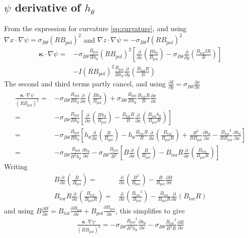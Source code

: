 \documentclass[12pt]{article}
\newcommand{\sbt}{\ensuremath{\sigma_{B\theta}}}
\newcommand{\deriv}[2]{\ensuremath{\frac{\partial #1}{\partial #2}}}
\newcommand{\hthe}{\ensuremath{h_\theta}}
\newcommand{\Bp}{\ensuremath{B_{\text{pol}}}}
\newcommand{\Bt}{\ensuremath{B_{\text{tor}}}}
\newcommand{\ve}[1]{\ensuremath{\boldsymbol{#1}}}
\newcommand{\kvec}{\ve{\kappa}}
\newcommand{\rbp}{\ensuremath{R\Bp}}
\newcommand{\rbpsq}{\ensuremath{\left(\rbp\right)^2}}
\begin{document}
\subsection{\texorpdfstring{$\psi$}{psi}
%
 derivative of \texorpdfstring{$\hthe$}{h}} From the expression for curvature
 \ref{eq:curvature}, and using $\nabla x \cdot \nabla \psi = \sbt
 \left(R\Bp\right)^2$ and $\nabla z\cdot\nabla \psi = -\sbt I
 \left(R\Bp\right)^2$
%
\begin{align*}
\kvec\cdot\nabla\psi =& -\sbt
    \frac{\Bp}{B\hthe}\rbpsq\left[\deriv{}{x}\left(\frac{B\hthe}{\Bp}\right) -
    \sbt\deriv{}{y}\left(\frac{\Bt IR}{B}\right)\right] \\ &- I\rbpsq
        \frac{\Bp}{B\hthe}\deriv{}{y}\left(\frac{\Bt R}{B}\right)
\end{align*}
%
The second and third terms partly cancel, and using $\deriv{I}{y} = \sbt
\deriv{\nu}{x}$
%
\begin{align*}
  \frac{\kvec\cdot\nabla\psi}{\rbpsq} =&
    -\sbt\frac{\Bp}{B\hthe}\deriv{}{x}\left(\frac{B\hthe}{\Bp}\right) +
    \sbt\frac{\Bp}{B\hthe}\frac{\Bt R}{B}\deriv{\nu}{x} \\ =&
    -\sbt\frac{\Bp}{B\hthe}\left[\deriv{}{x}\left(\frac{B\hthe}{\Bp}\right) -
    \frac{\Bt R}{B}\deriv{}{x}\left(\frac{\Bt\hthe}{\Bp R}\right)\right] \\ =&
        -\sbt\frac{\Bp}{B\hthe}\left[\hthe\deriv{}{x}\left(\frac{B}{\Bp}\right)
            - \hthe\frac{\Bt R}{B}\deriv{}{x}\left(\frac{\Bt}{\Bp R}\right) +
        \frac{B^2}{B\Bp}\deriv{\hthe}{x} -
    \frac{\Bt^2}{B\Bp}\deriv{\hthe}{x}\right] \\ =& -\sbt
        \frac{\Bp}{B^2\hthe}\deriv{\hthe}{x} -
        \sbt\frac{\Bp}{B^2}\left[B\deriv{}{x}\left(\frac{B}{\Bp}\right) - \Bt
        R\deriv{}{x}\left(\frac{\Bt}{\Bp R}\right)\right]
\end{align*}
%
Writing
%
\begin{align*}
B\deriv{}{x}\left(\frac{B}{\Bp}\right) =&
    \deriv{}{x}\left(\frac{B^2}{\Bp}\right) - \frac{B}{\Bp}\deriv{B}{x} \\ \Bt
    R\deriv{}{x}\left(\frac{\Bt}{\Bp R}\right) =&
    \deriv{}{x}\left(\frac{\Bt^2}{\Bp}\right) - \frac{\Bt}{\Bp
    R}\deriv{}{x}\left(\Bt R\right)
\end{align*}
%
and using $B\deriv{B}{x} = \Bt\deriv{\Bt}{x} + \Bp\deriv{\Bp}{x}$, this
simplifies to give
%
\begin{align}
\frac{\kvec\cdot\nabla\psi}{\rbpsq} =
-\sbt\frac{\Bp^2}{B^2\hthe}\deriv{\hthe}{x} - \sbt\frac{\Bt^2}{B^2
R}\deriv{R}{x}
\label{eq:dhdpsi}
\end{align}
\end{document}
